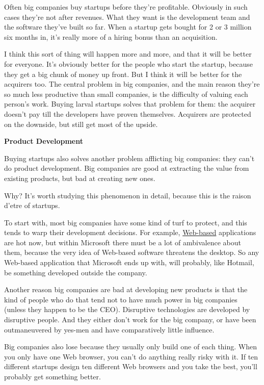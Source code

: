 Often big companies buy startups before they're profitable. Obviously in
such cases they're not after revenues. What they want is the development
team and the software they've built so far. When a startup gets bought
for 2 or 3 million six months in, it's really more of a hiring bonus
than an acquisition.

I think this sort of thing will happen more and more, and that it will
be better for everyone. It's obviously better for the people who start
the startup, because they get a big chunk of money up front. But I think
it will be better for the acquirers too. The central problem in big
companies, and the main reason they're so much less productive than
small companies, is the difficulty of valuing each person's work. Buying
larval startups solves that problem for them: the acquirer doesn't pay
till the developers have proven themselves. Acquirers are protected on
the downside, but still get most of the upside.

\textbf{Product Development}

Buying startups also solves another problem afflicting big companies:
they can't do product development. Big companies are good at extracting
the value from existing products, but bad at creating new ones.

Why? It's worth studying this phenomenon in detail, because this is the
raison d'etre of startups.

To start with, most big companies have some kind of turf to protect, and
this tends to warp their development decisions. For example,
\href{road.html}{Web-based} applications are hot now, but within
Microsoft there must be a lot of ambivalence about them, because the
very idea of Web-based software threatens the desktop. So any Web-based
application that Microsoft ends up with, will probably, like Hotmail, be
something developed outside the company.

Another reason big companies are bad at developing new products is that
the kind of people who do that tend not to have much power in big
companies (unless they happen to be the CEO). Disruptive technologies
are developed by disruptive people. And they either don't work for the
big company, or have been outmaneuvered by yes-men and have
comparatively little influence.

Big companies also lose because they usually only build one of each
thing. When you only have one Web browser, you can't do anything really
risky with it. If ten different startups design ten different Web
browsers and you take the best, you'll probably get something better.

